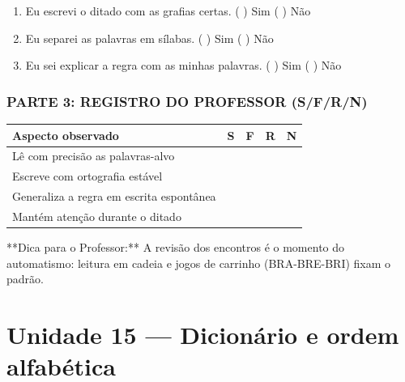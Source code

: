 \begin{exercicio}
\begin{enumerate}[label=\alph*)]
  \item Eu escrevi o ditado com as grafias certas.  \quad ( ) Sim   ( ) Não

  \item Eu separei as palavras em sílabas.  \quad ( ) Sim   ( ) Não

  \item Eu sei explicar a regra com as minhas palavras.  \quad ( ) Sim   ( ) Não

\end{enumerate}

\subsection*{PARTE 3: REGISTRO DO PROFESSOR (S/F/R/N)}

\begin{center}
\renewcommand{\arraystretch}{1.4}
\begin{tabular}{@{}p{9cm}cccc@{}}
\toprule
Aspecto observado & S & F & R & N \\
\midrule
Lê com precisão as palavras-alvo & & & & \\
Escreve com ortografia estável & & & & \\
Generaliza a regra em escrita espontânea & & & & \\
Mantém atenção durante o ditado & & & & \\
\bottomrule\end{tabular}\end{center}

\end{exercicio}

\begin{dica}
**Dica para o Professor:** A revisão dos encontros é o momento do automatismo: leitura em cadeia e jogos de carrinho (BRA-BRE-BRI) fixam o padrão.
\end{dica}


\chapter{Unidade 15 --- Dicionário e ordem alfabética}


